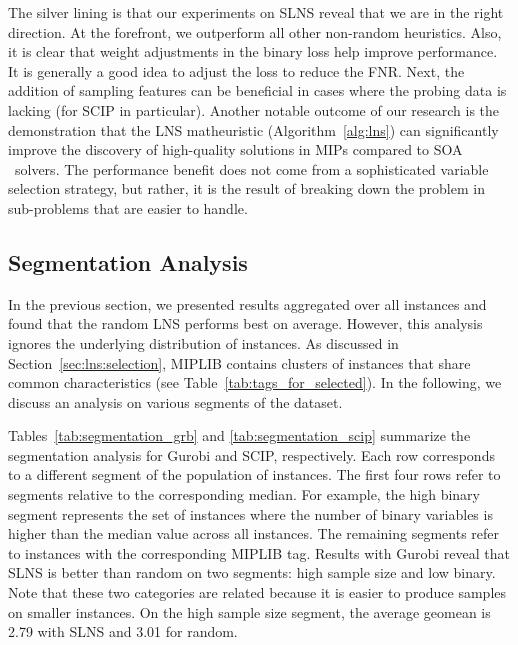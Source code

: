 \documentclass[3p, authoryear, times]{elsarticle}
\begin{document}
The silver lining is that our experiments on SLNS reveal that we are in the right direction. At the forefront, we outperform all other non-random heuristics. Also, it is clear that weight adjustments in the binary loss help improve performance. It is generally a good idea to adjust the loss to reduce the FNR. Next, the addition of sampling features can be beneficial in cases where the probing data is lacking (for SCIP in particular). Another notable outcome of our research is the demonstration that the LNS matheuristic (Algorithm~\ref{alg:lns}) can significantly improve the discovery of high-quality solutions in MIPs compared to SOA \bnb\ solvers.  The performance benefit does not come from a sophisticated variable selection strategy, but rather, it is the result of breaking down the problem in sub-problems that are easier to handle.  






\subsection{Segmentation Analysis} \label{sec:lns:segmentation} 
In the previous section, we presented results aggregated over all instances and found that the random LNS performs best on average. However, this analysis ignores the underlying distribution of instances. As discussed in Section~\ref{sec:lns:selection}, MIPLIB contains clusters of instances that share common characteristics (see Table~\ref{tab:tags_for_selected}). In the following, we discuss an analysis on various segments of the dataset. 

Tables~\ref{tab:segmentation_grb} and \ref{tab:segmentation_scip} summarize the segmentation analysis for Gurobi and SCIP, respectively. Each row corresponds to a different segment of the population of instances. The first four rows refer to segments relative to the corresponding median.  For example, the high binary segment represents the set of instances where the number of binary variables is higher than the median value across all instances. The remaining segments refer to instances with the corresponding MIPLIB tag. Results with Gurobi reveal that SLNS is better than random on two segments: high sample size and low binary. Note that these two categories are related because it is easier to produce samples on smaller instances. On the high sample size segment, the average geomean is 2.79 with SLNS and 3.01 for random.
\end{document}
